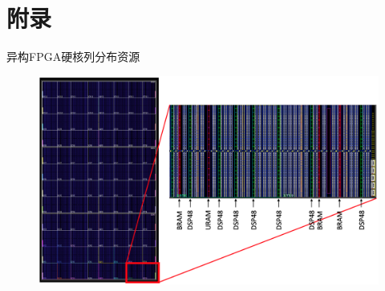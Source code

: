 \documentclass[10pt]{beamer}
\begin{document}
\section{附录}

\begin{frame}{异构FPGA硬核列分布资源}
  \begin{figure}
    \includegraphics[width=\textwidth]{img/architecture.png}
  \end{figure}
\end{frame}
\end{document}
